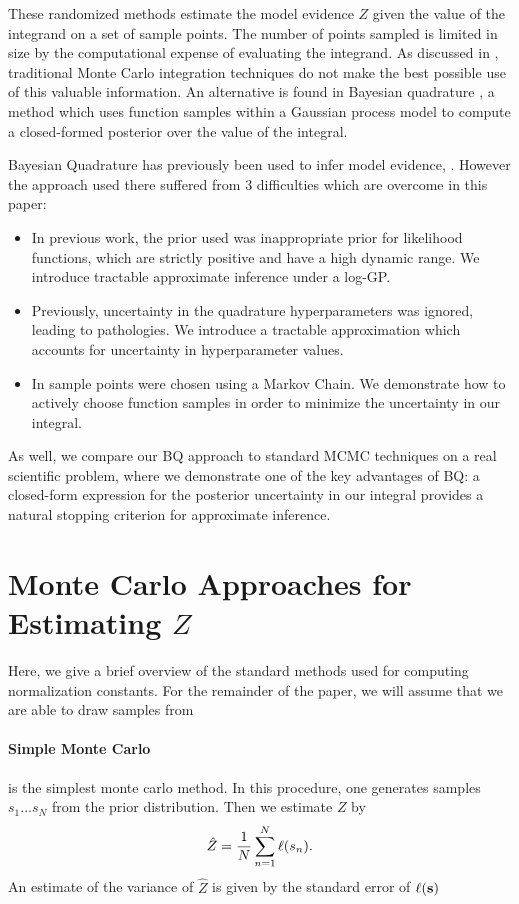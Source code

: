 \documentclass{article}
\begin{document}
These randomized methods estimate the model evidence $Z$ given the value of the integrand on a set of sample points.  The number of points sampled is limited in size by the computational expense of evaluating the integrand. As discussed in \citep{MCUnsound}, traditional Monte Carlo integration techniques do not make the best possible use of this valuable information. An alternative is found in Bayesian quadrature \citep{BZHermiteQuadrature}, a method which uses function samples within a Gaussian process model to compute a closed-formed posterior over the value of the integral.

Bayesian Quadrature has previously been used to infer model evidence, \citep{BZMonteCarlo}.  However the approach used there suffered from 3 difficulties which are overcome in this paper: 
\begin{itemize}
\item In previous work, the \gpb prior used was inappropriate prior for likelihood functions, which are strictly positive and have a high dynamic range.  We introduce tractable approximate inference under a log-GP.

\item Previously, uncertainty in the quadrature hyperparameters was ignored, leading to pathologies.  We introduce a tractable approximation which accounts for uncertainty in hyperparameter values.  

\item In \citep{BZMonteCarlo} sample points were chosen using a Markov Chain.  We demonstrate how to actively choose function samples in order to minimize the uncertainty in our integral.
\end{itemize}
As well, we compare our BQ approach to standard MCMC techniques on a real scientific problem, where we demonstrate one of the key advantages of BQ: a closed-form expression for the posterior uncertainty in our integral provides a natural stopping criterion for approximate inference.

\section{Monte Carlo Approaches for Estimating $Z$}

Here, we give a brief overview of the standard methods used for computing normalization constants.  For the remainder of the paper, we will assume that we are able to draw samples from 

\paragraph*{Simple Monte Carlo} is the simplest monte carlo method.  In this procedure, one generates samples $s_1 \dots s_N$ from the prior distribution.  Then we estimate $Z$ by $$\hat{Z} = \frac{1}{N} \sum_{n=1}^{N} \lfn(s_n).$$  An estimate of the variance of $\hat{Z}$ is given by the standard error of $\lfn({\bf s})$
\end{document}
